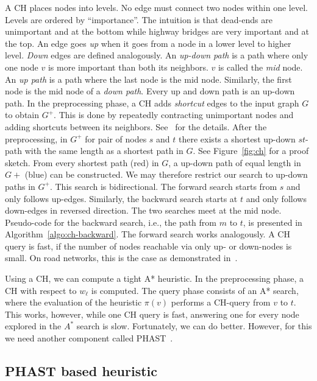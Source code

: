 \documentclass[letterpaper]{article} %
\begin{document}
A CH places nodes into levels.
No edge must connect two nodes within one level.
Levels are ordered by ``importance''.
The intuition is that dead-ends are unimportant and at the bottom while highway bridges are very important and at the top.
An edge goes \emph{up} when it goes from a node in a lower level to higher level.
\emph{Down} edges are defined analogously.
An \emph{up-down path} is a path where only one node $v$ is more important than both its neighbors.
$v$ is called the \emph{mid} node.
An \emph{up path} is a path where the last node is the mid node.
Similarly, the first node is the mid node of a \emph{down path}.
Every up and down path is an up-down path.
%
In the preprocessing phase, a CH adds \emph{shortcut} edges to the input graph $G$ to obtain $G^+$.
This is done by repeatedly contracting unimportant nodes and adding shortcuts between its neighbors.
See~\cite{gssv-erlrn-12} for the details.
After the preprocessing, in $G^+$ for pair of nodes $s$ and $t$ there exists a shortest up-down $st$-path with the same length as a shortest path in $G$.
See Figure~\ref{fig:ch} for a proof sketch.
From every shortest path (red) in $G$, a up-down path of equal length in $G+$ (blue) can be constructed.
We may therefore restrict our search to up-down paths in $G^+$.
This search is bidirectional.
The forward search starts from $s$ and only follows up-edges.
Similarly, the backward search starts at $t$ and only follows down-edges in reversed direction.
The two searches meet at the mid node.
Pseudo-code for the backward search, i.e., the path from $m$ to $t$, is presented in Algorithm~\ref{algo:ch-backward}.
The forward search works analogously.
%
A CH query is fast, if the number of nodes reachable via only up- or down-nodes is small.
On road networks, this is the case as demonstrated in~\cite{gssv-erlrn-12,dgrw-gpnc-11,dgpw-crprn-13,dsw-cch-15,hs-gbpo-18}.

Using a CH, we can compute a tight A* heuristic.
In the preprocessing phase, a CH with respect to $w_\ell$ is computed.
The query phase consists of an A* search, where the evaluation of the heuristic $\pi(v)$ performs a CH-query from $v$ to $t$.
%
This works, however, while one CH query is fast, answering one for every node explored in the $A^*$ search is slow.
Fortunately, we can do better.
However, for this we need another component called PHAST~\cite{dgnw-phast-13}.

\subsection{PHAST based heuristic}
\end{document}
